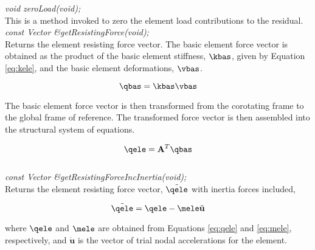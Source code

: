 {\em void zeroLoad(void);}\\
This is a method invoked to zero the element load contributions to the residual. \\ 

{\em const Vector \&getResistingForce(void);} \\
Returns the element resisting force vector.  The basic element force vector is obtained as
the product of the basic element stiffness, $\kbas$, given by Equation \ref{eq:kele}, and the
basic element deformations, $\vbas$.

\begin{equation}
\qbas = \kbas \vbas
\end{equation}

The basic element force vector is then transformed from the corotating frame to the global frame
of reference.  The transformed force vector is then assembled into the structural system
of equations.

\begin{equation}
\label{eq:qele}
\qele = \mathbf{A}^T \qbas
\end{equation} \\

{\em const Vector \&getResistingForceIncInertia(void);} \\
Returns the element resisting force vector, $\tilde{\qele}$ with inertia forces included,

\begin{equation}
\tilde{\qele} = \qele - \mele \ddot{\mathbf u}
\end{equation}

where $\qele$ and $\mele$ are obtained from Equations \ref{eq:qele} and \ref{eq:mele}, respectively,
and $\ddot{\mathbf u}$ is the vector of trial nodal accelerations for the element. \\